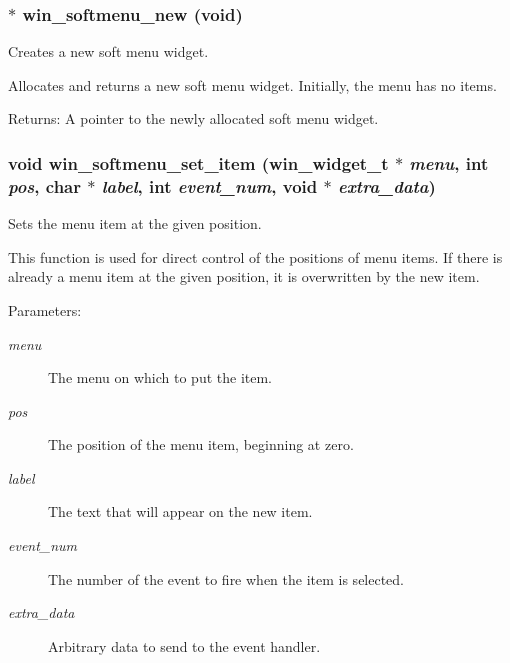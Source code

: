 \subsubsection{$\ast$ win\_\-softmenu\_\-new (void)}\label{winsoftmenu_8h_a1}


Creates a new soft menu widget. 

Allocates and returns a new soft menu widget. Initially, the menu has no items.

\begin{Desc}
\item[Returns:]A pointer to the newly allocated soft menu widget. \end{Desc}
\subsubsection{\setlength{\rightskip}{0pt plus 5cm}void win\_\-softmenu\_\-set\_\-item ({\bf win\_\-widget\_\-t} $\ast$ {\em menu}, int {\em pos}, char $\ast$ {\em label}, int {\em event\_\-num}, void $\ast$ {\em extra\_\-data})}\label{winsoftmenu_8h_a2}


Sets the menu item at the given position. 

This function is used for direct control of the positions of menu items. If there is already a menu item at the given position, it is overwritten by the new item.

\begin{Desc}
\item[Parameters:]
\begin{description}
\item[{\em menu}]The menu on which to put the item. \item[{\em pos}]The position of the menu item, beginning at zero. \item[{\em label}]The text that will appear on the new item. \item[{\em event\_\-num}]The number of the event to fire when the item is selected. \item[{\em extra\_\-data}]Arbitrary data to send to the event handler. \end{description}
\end{Desc}
